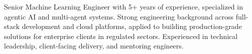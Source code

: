 

\begin{cvparagraph}

Senior Machine Learning Engineer with 5+ years of experience, specialized in agentic AI and multi-agent systems. Strong engineering background across full-stack development and cloud platforms, applied to building production-grade solutions for enterprise clients in regulated sectors. Experienced in technical leadership, client-facing delivery, and mentoring engineers.
\end{cvparagraph}
